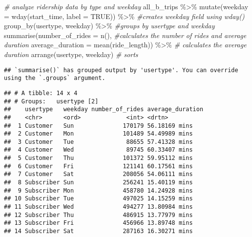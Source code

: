 \documentclass[
]{article}
\newenvironment{Shaded}{\begin{snugshade}}{\end{snugshade}}
\newcommand{\AttributeTok}[1]{\textcolor[rgb]{0.77,0.63,0.00}{#1}}
\newcommand{\CommentTok}[1]{\textcolor[rgb]{0.56,0.35,0.01}{\textit{#1}}}
\newcommand{\ConstantTok}[1]{\textcolor[rgb]{0.00,0.00,0.00}{#1}}
\newcommand{\FunctionTok}[1]{\textcolor[rgb]{0.00,0.00,0.00}{#1}}
\newcommand{\NormalTok}[1]{#1}
\newcommand{\SpecialCharTok}[1]{\textcolor[rgb]{0.00,0.00,0.00}{#1}}
\begin{document}
\begin{Shaded}
\begin{Highlighting}[]
\CommentTok{\# analyze ridership data by type and weekday}
\NormalTok{all\_b\_trips }\SpecialCharTok{\%\textgreater{}\%} 
  \FunctionTok{mutate}\NormalTok{(}\AttributeTok{weekday =} \FunctionTok{wday}\NormalTok{(start\_time, }\AttributeTok{label =} \ConstantTok{TRUE}\NormalTok{)) }\SpecialCharTok{\%\textgreater{}\%}  \CommentTok{\#creates weekday field using wday()}
  \FunctionTok{group\_by}\NormalTok{(usertype, weekday) }\SpecialCharTok{\%\textgreater{}\%}  \CommentTok{\#groups by usertype and weekday}
  \FunctionTok{summarise}\NormalTok{(}\AttributeTok{number\_of\_rides =} \FunctionTok{n}\NormalTok{(),                          }\CommentTok{\#calculates the number of rides and average duration }
  \AttributeTok{average\_duration =} \FunctionTok{mean}\NormalTok{(ride\_length)) }\SpecialCharTok{\%\textgreater{}\%}         \CommentTok{\# calculates the average duration}
  \FunctionTok{arrange}\NormalTok{(usertype, weekday)                                }\CommentTok{\# sorts}
\end{Highlighting}
\end{Shaded}

\begin{verbatim}
## `summarise()` has grouped output by 'usertype'. You can override using the `.groups` argument.
\end{verbatim}

\begin{verbatim}
## # A tibble: 14 x 4
## # Groups:   usertype [2]
##    usertype   weekday number_of_rides average_duration
##    <chr>      <ord>             <int> <drtn>          
##  1 Customer   Sun              170179 56.18169 mins   
##  2 Customer   Mon              101489 54.49989 mins   
##  3 Customer   Tue               88655 57.41328 mins   
##  4 Customer   Wed               89745 60.33407 mins   
##  5 Customer   Thu              101372 59.95112 mins   
##  6 Customer   Fri              121141 60.17561 mins   
##  7 Customer   Sat              208056 54.06111 mins   
##  8 Subscriber Sun              256241 15.40119 mins   
##  9 Subscriber Mon              458780 14.24928 mins   
## 10 Subscriber Tue              497025 14.15259 mins   
## 11 Subscriber Wed              494277 13.80984 mins   
## 12 Subscriber Thu              486915 13.77979 mins   
## 13 Subscriber Fri              456966 13.89748 mins   
## 14 Subscriber Sat              287163 16.30271 mins
\end{verbatim}
\end{document}
